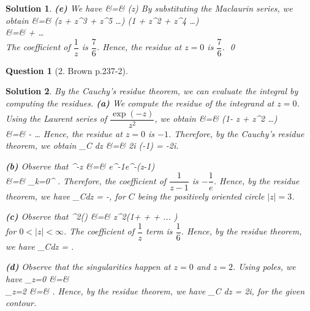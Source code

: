 \documentclass{article} %
\def\eQb#1\eQe{\begin{eqnarray*}#1\end{eqnarray*}}
\theoremstyle{quest}
\newtheorem*{question}{Question}
\newtheorem*{solution}{Solution}
\begin{document}
\begin{solution}
\smallskip

\textbf{(e)}
We have
\eQb
\dfrac{\sinh(z)}{z^4(1-z^2)} &=& \sinh(z) \cdot {} \cdot
{} 
\eQe
By substituting the Maclaurin series, we obtain
\eQb
\dfrac{\sinh(z)}{z^4(1-z^2)} &=&
(z + z^3 + z^5 \dots )
(1 + z^2 + z^4 \dots) \\
&=&  +  \dots \\
\eQe
The coefficient of $\dfrac{1}{z}$ is $\dfrac{7}{6}$. Hence, the residue
at $z = 0$ is $\dfrac{7}{6}$. \qed
\end{solution}


\bigskip

\begin{question}[2. Brown p.237-2]
\end{question}
\begin{solution}
By the Cauchy's residue theorem, we can evaluate the integral by
computing the residues.
\textbf{(a)} We compute the residue of the integrand at $z = 0$. 
Using the Laurent series of $\dfrac{\exp(-z)}{z^2}$, we obtain
\eQb
\dfrac{\exp(-z^2)}{z^2} &=& (1- z + 
z^2 \dots ) \\
&=&  -  \dots
\eQe
Hence, the residue at $z = 0$ is $-1$. Therefore, by the Cauchy's
residue theorem, we obtain
\eQb
\int_{C} dz &=& 2\pi i (-1) = -2\pi i.
\eQe

\smallskip

\textbf{(b)}
Observe that 
\eQb
e^{-z} &=& e^{-1}e^{-(z-1)} \\
&=& \sum_{k=0}^{\infty}  .
\eQe
Therefore, the coefficient of $\dfrac{1}{z-1}$ is $-\dfrac{1}{e}$.
Hence, by the residue theorem, we have
\eQb
\int_{C}dz = -,
\eQe
for $C$ being the positively oriented circle $|z| = 3$. 

\smallskip

\textbf{(c)}
Observe that
\eQb
z^2\exp() &=& z^2(1+ + 
 +  ... ) \\
\eQe
for $0 < |z| < \infty$. The coefficient of $\dfrac{1}{z}$ term is
$\dfrac{1}{6}$. Hence, by the residue theorem, we have
\eQb
\int_{C}dz = .
\eQe
\smallskip

\textbf{(d)} 
Observe that the singularities happen at $z = 0$ and $z = 2$. Using poles,
we have
\eQb
\text{Res}_{z=0} &=&   \\
_{z=2} &=& .
\eQe 
Hence, by the residue theorem, we have
\eQb
\int_{C}  dz = 2\pi i,
\eQe
for the given contour. 

\smallskip

\end{solution}
\end{document}
